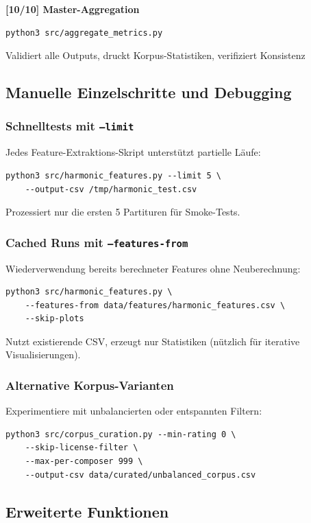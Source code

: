 \documentclass[10pt,a4paper]{article}
\theoremstyle{definition}
\begin{document}
\textbf{[10/10] Master-Aggregation}
\begin{lstlisting}
python3 src/aggregate_metrics.py
\end{lstlisting}
Validiert alle Outputs, druckt Korpus-Statistiken, verifiziert Konsistenz

\subsection{Manuelle Einzelschritte und Debugging}

\subsubsection{Schnelltests mit \texttt{--limit}}

Jedes Feature-Extraktions-Skript unterstützt partielle Läufe:
\begin{lstlisting}
python3 src/harmonic_features.py --limit 5 \
    --output-csv /tmp/harmonic_test.csv
\end{lstlisting}
Prozessiert nur die ersten 5 Partituren für Smoke-Tests.

\subsubsection{Cached Runs mit \texttt{--features-from}}

Wiederverwendung bereits berechneter Features ohne Neuberechnung:
\begin{lstlisting}
python3 src/harmonic_features.py \
    --features-from data/features/harmonic_features.csv \
    --skip-plots
\end{lstlisting}
Nutzt existierende CSV, erzeugt nur Statistiken (nützlich für iterative Visualisierungen).

\subsubsection{Alternative Korpus-Varianten}

Experimentiere mit unbalancierten oder entspannten Filtern:
\begin{lstlisting}
python3 src/corpus_curation.py --min-rating 0 \
    --skip-license-filter \
    --max-per-composer 999 \
    --output-csv data/curated/unbalanced_corpus.csv
\end{lstlisting}

\subsection{Erweiterte Funktionen}
\end{document}
